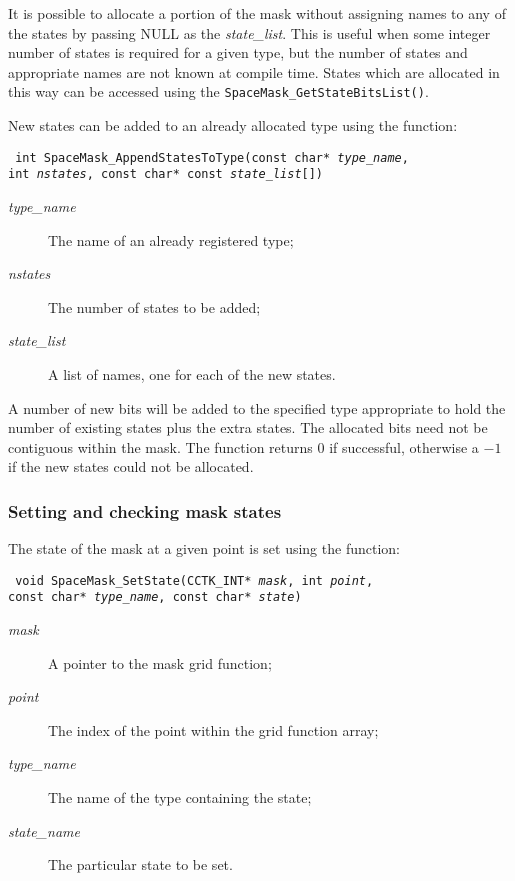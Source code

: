 \documentclass{article}
\begin{document}
It is possible to allocate a portion of the mask without assigning
names to any of the states by passing NULL as the \emph{state\_list}.
This is useful when some integer number of states is required for a
given type, but the number of states and appropriate names are not
known at compile time. States which are allocated in this way can be
accessed using the \texttt{SpaceMask\_GetStateBitsList()}.

New states can be added to an already allocated type using the
function:

\indent\parbox{\linewidth}{
\vspace{\baselineskip}\noindent\texttt{
int SpaceMask\_AppendStatesToType(const char* \emph{type\_name},
  \\\hspace*{10mm}
  int \emph{nstates}, const char* const \emph{state\_list}[])
}\\
\hspace*{10mm}\parbox{\linewidth}{
\begin{description}
  \item[\emph{type\_name}] The name of an already registered type;
  \item[\emph{nstates}] The number of states to be added;
  \item[\emph{state\_list}] A list of names, one for each of the new
    states.
\end{description}
}}

\noindent A number of new bits will be added to the specified type
appropriate to hold the number of existing states plus the extra
states. The allocated bits need not be contiguous within the mask.
The function returns $0$ if successful, otherwise a $-1$ if the new
states could not be allocated.


\subsubsection{Setting and checking mask states}

The state of the mask at a given point is set using the function:

\indent\parbox{\linewidth}{
\vspace{\baselineskip}\noindent\texttt{
void SpaceMask\_SetState(CCTK\_INT* \emph{mask}, int \emph{point},
  \\\hspace*{10mm}
  const char* \emph{type\_name}, const char* \emph{state})
}\\
\hspace*{10mm}\parbox{\linewidth}{
\begin{description}
  \item[\emph{mask}] A pointer to the mask grid function;
  \item[\emph{point}] The index of the point within the grid function
    array;
  \item[\emph{type\_name}] The name of the type containing the state;
  \item[\emph{state\_name}] The particular state to be set.
\end{description}
}}
\end{document}
